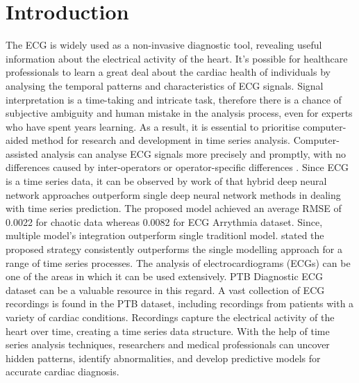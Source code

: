 \documentclass[a4paper, fleqn]{cas-sc}
\begin{document}
\section{Introduction}
The ECG is widely used as a non-invasive diagnostic tool,  revealing useful information about the electrical activity of the heart. It's possible for healthcare professionals to learn a great deal about the cardiac health of individuals by analysing the temporal patterns and characteristics of ECG signals. Signal interpretation is a time-taking and intricate task,  therefore there is a chance of subjective ambiguity and human mistake in the analysis process,  even for experts who have spent years learning. As a result,  it is essential to prioritise computer-aided method for research  and development in time series analysis.  Computer-assisted analysis can analyse ECG signals more precisely and promptly,  with no differences caused by inter-operators or operator-specific differences \cite{liu2021deep}. Since ECG is a time series data,  it can be observed by work of \cite{dudukcu2023temporal} that hybrid deep neural network approaches outperform single deep neural network methods in dealing with time series prediction. The proposed model achieved an average RMSE of 0.0022 for chaotic data whereas 0.0082 for ECG Arrythmia dataset. Since, multiple model's integration outperform single traditionl model.   \cite{zhang2007neural} stated the proposed strategy consistently outperforms the single modelling approach for a range of time series processes. The analysis of electrocardiograms (ECGs) can be one of the areas in which it can be used extensively. PTB Diagnostic ECG dataset can be a valuable resource in this regard. A vast collection of ECG recordings is found in the PTB dataset,  including recordings from patients with a variety of cardiac conditions. Recordings capture the electrical activity of the heart over time,  creating a time series data structure. With the help of time series analysis techniques,  researchers and medical professionals can uncover hidden patterns,  identify abnormalities,  and develop predictive models for accurate cardiac diagnosis.
\end{document}
